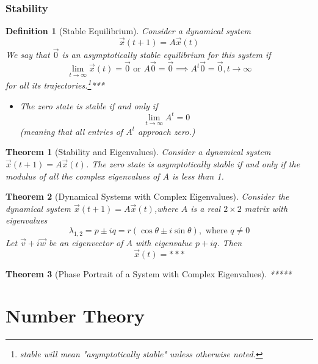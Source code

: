\documentclass[10pt]{report}
\newtheorem{thm2}{Theorem}[section]
\newtheorem{def2}{Definition}[section]
\begin{document}
\section{Stability}
\begin{def2}[Stable Equilibrium]
Consider a dynamical system
$$\vec{x}(t+1)=A\vec{x}(t)$$
We say that $\vec{0}$ is an asymptotically stable equilibrium for this system if 
$$\lim_{t\to \infty}\vec{x}(t)=\vec{0}\text{  or } A\vec{0}=\vec{0}\implies A^t\vec{0}=\vec{0}, t\to \infty$$
for all its trajectories.\footnote{stable will mean "asymptotically stable" unless otherwise noted.}***
\begin{itemize}
\item[Note:] The zero state is stable if and only if
$$\lim_{t\to \infty}A^t=0$$
(meaning that all entries of $A^t$ approach zero.)
\end{itemize}
\end{def2}
\begin{thm2}[Stability and Eigenvalues]
Consider a dynamical system $\vec{x}(t+1)=A\vec{x}(t)$. The zero state is asymptotically stable if and only if the modulus of all the complex eigenvalues of $A$ is less than 1.
\end{thm2}
\begin{thm2}[Dynamical Systems with Complex Eigenvalues]
Consider the dynamical system $\vec{x}(t+1)=A\vec{x}(t)$,where $A$ is a real $2\times 2$ matrix with eigenvalues
$$\lambda_{1,2}=p\pm iq=r(\cos\theta \pm i\sin\theta), \text{  where  } q\neq 0$$
Let $\vec{v}+i\vec{w}$ be an eigenvector of $A$ with eigenvalue $p+iq$. Then
$$\vec{x}(t)=***$$
\end{thm2}
\begin{thm2}[Phase Portrait of a System with Complex Eigenvalues]
*****
\end{thm2}

\part{Number Theory}
\end{document}
